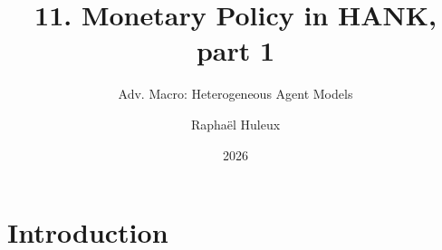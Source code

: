 \documentclass[10pt,english]{beamer}
\begin{document}
\title{11. Monetary Policy in HANK, part 1\vspace{-2mm}}
\subtitle{Adv. Macro: Heterogeneous Agent Models}
\author{Raphaël Huleux}
\date{2026}

{
\begin{frame}

\maketitle

\end{frame}
}

\addtocounter{framenumber}{-1}

\section{Introduction}
\end{document}
